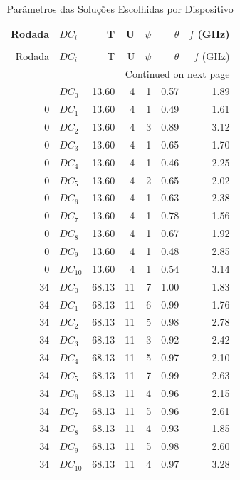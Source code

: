 \begin{longtable}{rlrrrrr}
\caption{Parâmetros das Soluções Escolhidas por Dispositivo} \label{tab:solucoes_dc} \\
\toprule
Rodada & $DC_i$ & T & U & $\psi$ & $\theta$ & $f$ (GHz) \\
\midrule
\endfirsthead
\caption[]{Parâmetros das Soluções Escolhidas por Dispositivo} \\
\toprule
Rodada & $DC_i$ & T & U & $\psi$ & $\theta$ & $f$ (GHz) \\
\midrule
\endhead
\midrule
\multicolumn{7}{r}{Continued on next page} \\
\midrule
\endfoot
\bottomrule
\endlastfoot
0 & $DC_{0}$ & 13.60 & 4 & 1 & 0.57 & 1.89 \\
0 & $DC_{1}$ & 13.60 & 4 & 1 & 0.49 & 1.61 \\
0 & $DC_{2}$ & 13.60 & 4 & 3 & 0.89 & 3.12 \\
0 & $DC_{3}$ & 13.60 & 4 & 1 & 0.65 & 1.70 \\
0 & $DC_{4}$ & 13.60 & 4 & 1 & 0.46 & 2.25 \\
0 & $DC_{5}$ & 13.60 & 4 & 2 & 0.65 & 2.02 \\
0 & $DC_{6}$ & 13.60 & 4 & 1 & 0.63 & 2.38 \\
0 & $DC_{7}$ & 13.60 & 4 & 1 & 0.78 & 1.56 \\
0 & $DC_{8}$ & 13.60 & 4 & 1 & 0.67 & 1.92 \\
0 & $DC_{9}$ & 13.60 & 4 & 1 & 0.48 & 2.85 \\
0 & $DC_{10}$ & 13.60 & 4 & 1 & 0.54 & 3.14 \\
34 & $DC_{0}$ & 68.13 & 11 & 7 & 1.00 & 1.83 \\
34 & $DC_{1}$ & 68.13 & 11 & 6 & 0.99 & 1.76 \\
34 & $DC_{2}$ & 68.13 & 11 & 5 & 0.98 & 2.78 \\
34 & $DC_{3}$ & 68.13 & 11 & 3 & 0.92 & 2.42 \\
34 & $DC_{4}$ & 68.13 & 11 & 5 & 0.97 & 2.10 \\
34 & $DC_{5}$ & 68.13 & 11 & 7 & 0.99 & 2.63 \\
34 & $DC_{6}$ & 68.13 & 11 & 4 & 0.96 & 2.15 \\
34 & $DC_{7}$ & 68.13 & 11 & 5 & 0.96 & 2.61 \\
34 & $DC_{8}$ & 68.13 & 11 & 4 & 0.93 & 1.85 \\
34 & $DC_{9}$ & 68.13 & 11 & 5 & 0.98 & 2.60 \\
34 & $DC_{10}$ & 68.13 & 11 & 4 & 0.97 & 3.28 \\

\end{longtable}
